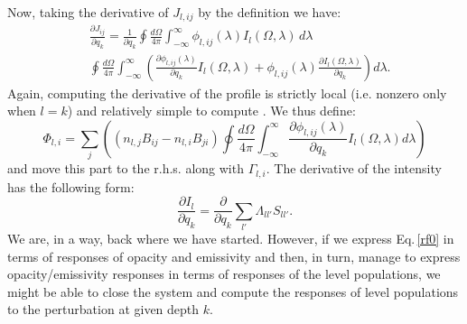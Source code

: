\documentclass[referee]{aa}
\begin{document}
Now, taking the derivative of $J_{l,ij}$ by the definition we have:
\begin{align}
 & \frac{\partial J_{ij}}{\partial q_k} = \frac{1}{\partial q_k} \oint \frac{d\Omega}{4\pi} \int_{-\infty}^{\infty} \phi_{l,ij}(\lambda) I_l(\Omega,\lambda)\,d\lambda \nonumber \\
 & \oint \frac{d\Omega}{4\pi} \int_{-\infty}^{\infty} \left (\frac{\partial\phi_{l,ij}(\lambda)}{\partial q_k} I_l(\Omega,\lambda) +  \phi_{l,ij}(\lambda) \frac{\partial I_l(\Omega,\lambda)}{\partial q_k} \right)d\lambda.
\end{align}
Again, computing the derivative of the profile is strictly local (i.e. nonzero only when $l=k$) and relatively simple to compute \citep[see][]{dtibook}. We thus define:
\begin{equation}
 \Phi_{l,i} = \sum_j \left ( (n_{l,j} B_{ij} - n_{l,i} B_{ji}) \oint \frac{d\Omega}{4\pi} \int_{-\infty}^{\infty} \frac{\partial\phi_{l,ij}(\lambda)}{\partial q_k} I_l(\Omega,\lambda) d\lambda \right )
\end{equation}
and move this part to the r.h.s. along with $\Gamma_{l,i}$. The derivative of the intensity has the following form:
\begin{equation}
 \frac{\partial I_l}{\partial q_k} = \frac{\partial}{\partial q_k} \sum_{l'} \Lambda_{ll'} S_{ll'}.
 \label{rf0}
\end{equation}
We are, in a way, back where we have started. However, if we express Eq.\,\ref{rf0} in terms of responses of opacity and emissivity and then, in turn, manage to express opacity/emissivity responses in terms of responses of the level populations, we might be able to close the system and compute the responses of level populations to the perturbation at given depth $k$. 
\end{document}
